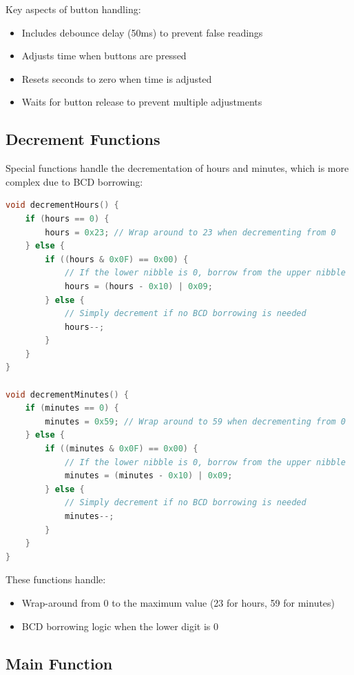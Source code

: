 \documentclass[12pt]{article}
\begin{document}
Key aspects of button handling:
\begin{itemize}
    \item Includes debounce delay (50ms) to prevent false readings
    \item Adjusts time when buttons are pressed
    \item Resets seconds to zero when time is adjusted
    \item Waits for button release to prevent multiple adjustments
\end{itemize}

\subsection{Decrement Functions}

Special functions handle the decrementation of hours and minutes, which is more complex due to BCD borrowing:

\begin{lstlisting}[language=C, caption=Hour and Minute Decrement Functions]
void decrementHours() {
    if (hours == 0) {
        hours = 0x23; // Wrap around to 23 when decrementing from 0
    } else {
        if ((hours & 0x0F) == 0x00) {
            // If the lower nibble is 0, borrow from the upper nibble
            hours = (hours - 0x10) | 0x09;
        } else {
            // Simply decrement if no BCD borrowing is needed
            hours--;
        }
    }
}

void decrementMinutes() {
    if (minutes == 0) {
        minutes = 0x59; // Wrap around to 59 when decrementing from 0
    } else {
        if ((minutes & 0x0F) == 0x00) {
            // If the lower nibble is 0, borrow from the upper nibble
            minutes = (minutes - 0x10) | 0x09;
        } else {
            // Simply decrement if no BCD borrowing is needed
            minutes--;
        }
    }
}
\end{lstlisting}

These functions handle:
\begin{itemize}
    \item Wrap-around from 0 to the maximum value (23 for hours, 59 for minutes)
    \item BCD borrowing logic when the lower digit is 0
\end{itemize}

\subsection{Main Function}
\end{document}
